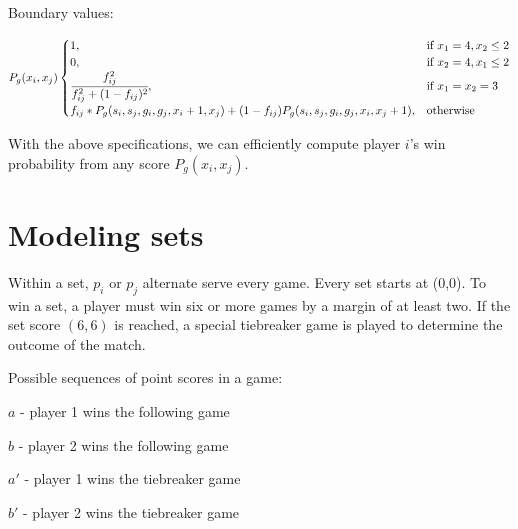 \documentclass[chapterprefix=false]{report}
\begin{document}
Boundary values:

\begin{equation}
    P_g(x_i,x_j) 
    \begin{cases}
      1, & \text{if}\ x_1=4,x_2 \leq 2 \\
      0, & \text{if}\ x_2=4,x_1 \leq 2 \\
      \cfrac{f_{ij}^2}{f_{ij}^2+(1-f_{ij})^2}, & \text{if}\ x_1=x_2=3 \\
      f_{ij}*P_g(s_i,s_j,g_i,g_j,{x}_i+1,{x}_j) + (1-f_{ij}) P_g(s_i,s_j,g_i,g_j,{x}_i,{x}_j+1), & \text{otherwise}\ \\
      
    \end{cases}
  \end{equation}

With the above specifications, we can efficiently compute player $i$'s win probability from any score $P_g(x_i,x_j)$.

\section{Modeling sets}

Within a set, $p_i$ or $p_j$ alternate serve every game. Every set starts at (0,0). To win a set, a player must win six or more games by a margin of at least two. If the set score $(6,6)$ is reached, a special tiebreaker game is played to determine the outcome of the match.

Possible sequences of point scores in a game:

$a$ - player 1 wins the following game

$b$ - player 2 wins the following game

$a'$ - player 1 wins the tiebreaker game

$b'$ - player 2 wins the tiebreaker game
\end{document}
